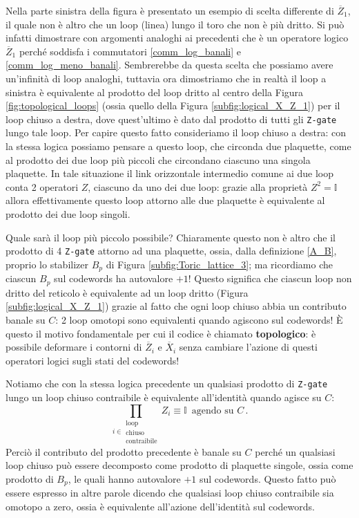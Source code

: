 \noindent Nella parte sinistra della figura è presentato un esempio di scelta differente di $\overline{Z}_1$, il quale non è altro che un loop (linea) lungo il toro che non è più dritto. Si può infatti dimostrare con argomenti analoghi ai precedenti che è un operatore logico $\overline{Z}_1$ perché soddisfa i commutatori \eqref{comm_log_banali} e \eqref{comm_log_meno_banali}.  Sembrerebbe da questa scelta che possiamo avere un'infinità di loop analoghi, tuttavia ora dimostriamo che in realtà il loop a sinistra è equivalente al prodotto del loop dritto al centro della Figura \ref{fig:topological_loops} (ossia quello della Figura \ref{subfig:logical_X_Z_1}) per il loop chiuso a destra, dove quest'ultimo è dato dal prodotto di tutti gli \texttt{Z-gate} lungo tale loop. Per capire questo fatto consideriamo il loop chiuso a destra: con la stessa logica possiamo pensare a questo loop, che circonda due plaquette, come al prodotto dei due loop più piccoli che circondano ciascuno una singola plaquette. In tale situazione il link orizzontale intermedio comune ai due loop conta 2 operatori $Z$, ciascuno da uno dei due loop: grazie alla proprietà $Z^2 = \mathbb{I}$ allora effettivamente questo loop attorno alle due plaquette è equivalente al prodotto dei due loop singoli. 

\noindent Quale sarà il loop più piccolo possibile? Chiaramente questo non è altro che il prodotto di 4 \texttt{Z-gate} attorno ad una plaquette, ossia, dalla definizione \eqref{A_B}, proprio lo stabilizer $B_p$ di Figura \ref{subfig:Toric_lattice_3}; ma ricordiamo che ciascun $B_p$ sul codewords ha autovalore $+1$! Questo significa che ciascun loop non dritto del reticolo è equivalente ad un loop dritto (Figura \ref{subfig:logical_X_Z_1}) grazie al fatto che ogni loop chiuso abbia un contributo banale su $C$: 2 loop omotopi sono equivalenti quando agiscono sul codewords! È questo il motivo fondamentale per cui il codice è chiamato \textbf{topologico}: è possibile deformare i contorni di $\overline{Z}_i$ e $\overline{X}_i$ senza cambiare l'azione di questi operatori logici sugli stati del codewords!

\noindent Notiamo che con la stessa logica precedente un qualsiasi prodotto di \texttt{Z-gate} lungo un loop chiuso contraibile è equivalente all'identità quando agisce su $C$:
\begin{equation}\label{product_Z_closed_loop}
    \prod_{i \in \substack{\text{loop} \\ \text{chiuso}\\ \text{contraibile}}} Z_i \equiv \mathbb{I} \, \text{ agendo su } C \, .
\end{equation}
Perciò il contributo del prodotto precedente è banale su $C$ perché un qualsiasi loop chiuso può essere decomposto come prodotto di plaquette singole, ossia come prodotto di $B_p$, le quali hanno autovalore $+1$ sul codewords. Questo fatto può essere espresso in altre parole dicendo che qualsiasi loop chiuso contraibile sia omotopo a zero, ossia è equivalente all'azione dell'identità sul codewords. 

